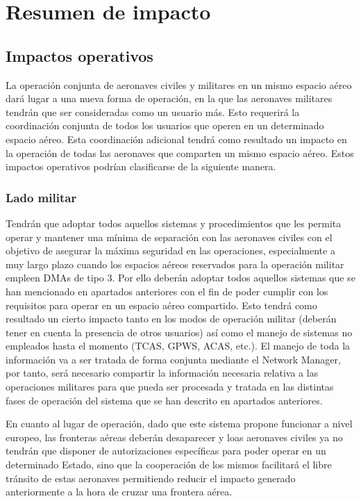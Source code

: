\section{Resumen de impacto}
\cbstart
\subsection{Impactos operativos}

La operación conjunta de aeronaves civiles y militares en un mismo espacio aéreo dará lugar a una nueva forma de operación, en la que las aeronaves militares tendrán que ser consideradas como un usuario más. Esto requerirá la coordinación conjunta de todos los usuarios que operen en un determinado espacio aéreo. Esta coordinación adicional tendrá como resultado un impacto en la operación de todas las aeronaves que comparten un mismo espacio aéreo. Estos impactos operativos podrían clasificarse de la siguiente manera.

\subsubsection{Lado militar}

Tendrán que adoptar todos aquellos sistemas y procedimientos que les permita operar y mantener una mínima de separación con las aeronaves civiles con el objetivo de asegurar la máxima seguridad en las operaciones, especialmente a muy largo plazo cuando los espacios aéreos reservados para la operación militar empleen DMAs de tipo 3. Por ello deberán adoptar todos aquellos sistemas que se han mencionado en apartados anteriores con el fin de poder cumplir con los requisitos para operar en un espacio aéreo compartido. Esto tendrá como resultado un cierto impacto tanto en los modos de operación militar (deberán tener en cuenta la presencia de otros usuarios) así como el manejo de sistemas no empleados hasta el momento (TCAS, GPWS, ACAS, etc.). El manejo de toda la información va a ser tratada de forma conjunta mediante el Network Manager, por tanto, será necesario compartir la información necesaria relativa a las operaciones militares para que pueda ser procesada y tratada en las distintas fases de operación del sistema que se han descrito en apartados anteriores. 

En cuanto al lugar de operación, dado que este sistema propone funcionar a nivel europeo, las fronteras aéreas deberán desaparecer y loas aeronaves civiles ya no tendrán que disponer de autorizaciones específicas para poder operar en un determinado Estado, sino que la cooperación de los mismos facilitará el libre tránsito de estas aeronaves permitiendo reducir el impacto generado anteriormente a la hora de cruzar una frontera aérea. 

